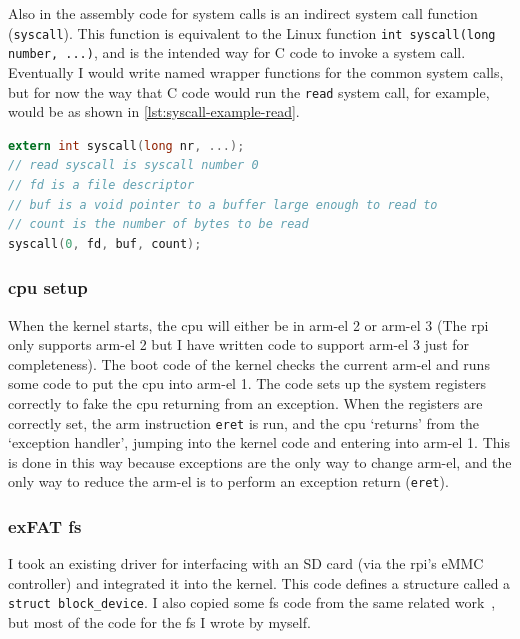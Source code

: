 \documentclass{article}
\begin{document}
Also in the assembly code for system calls is an indirect system call function
(\verb!syscall!). This function is equivalent to the Linux function
\verb!int syscall(long number, ...)!, and is the intended way for C code to
invoke a system call. Eventually I would write named wrapper functions for the
common system calls, but for now the way that C code would run the
\texttt{read} system call, for example, would be as shown in
\autoref{lst:syscall-example-read}.

\begin{lstlisting}[language=C, caption={How some C code would invoke the system
                   call \texttt{read} in the current implementation.}, float,
                   label={lst:syscall-example-read}]
extern int syscall(long nr, ...);
// read syscall is syscall number 0
// fd is a file descriptor
// buf is a void pointer to a buffer large enough to read to
// count is the number of bytes to be read
syscall(0, fd, buf, count);
\end{lstlisting}

\subsubsection{\texorpdfstring{\gls{cpu}}{CPU} setup}
\label{sec:impl_cpu_setup}
When the kernel starts, the \gls{cpu} will either be in \gls{arm-el} 2 or
\gls{arm-el} 3 (The \gls{rpi} only supports \gls{arm-el} 2 but I have written
code to support \gls{arm-el} 3 just for completeness). The boot code of the
kernel checks the current \gls{arm-el} and runs some code to put the \gls{cpu}
into \gls{arm-el} 1. The code sets up the system registers correctly to fake
the \gls{cpu} returning from an exception. When the registers are correctly
set, the \gls{arm} instruction \texttt{eret} is run, and the \gls{cpu}
`returns' from the `exception handler', jumping into the kernel code and
entering into \gls{arm-el} 1. This is done in this way because exceptions are
the only way to change \gls{arm-el}, and the only way to reduce the
\gls{arm-el} is to perform an exception return (\texttt{eret}).

\subsubsection{exFAT \texorpdfstring{\gls{fs}}{Filesystem}}
\label{sec:impl_fs}
I took an existing driver for interfacing with an SD card (via the \gls{rpi}'s
eMMC controller) and integrated it into the kernel. This code defines a
structure called a \verb!struct block_device!. I also copied some \gls{fs} code
from the same related work~\cite{rpi-boot-gh}, but most of the code for the
\gls{fs} I wrote by myself.
\end{document}
